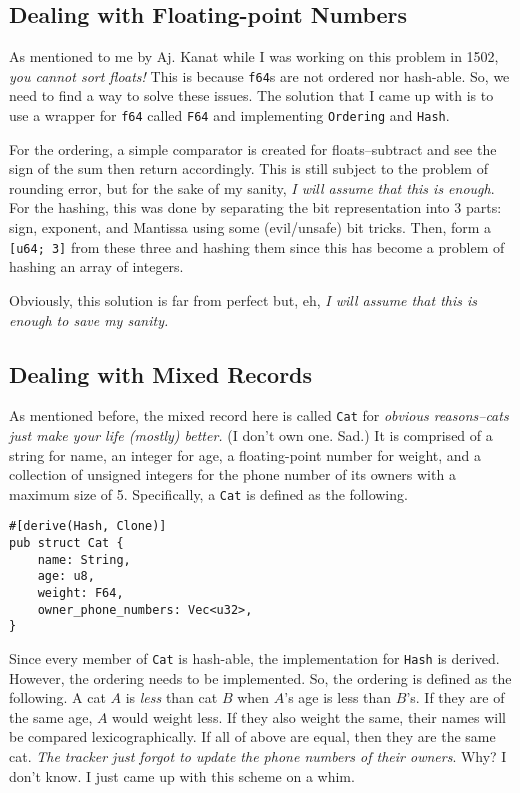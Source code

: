 \subsection*{Dealing with Floating-point Numbers}

As mentioned to me by Aj. Kanat while I was working on this problem in 1502, \textit{you cannot sort floats!}
This is because \texttt{f64}s are not ordered nor hash-able. So, we need to find a way to solve these issues.
The solution that I came up with is to use a wrapper for \texttt{f64} called \texttt{F64} and implementing \texttt{Ordering} and \texttt{Hash}.

For the ordering, a simple comparator is created for floats--subtract and see the sign of the sum then return accordingly.
This is still subject to the problem of rounding error, but for the sake of my sanity, \textit{I will assume that this is enough}.
For the hashing, this was done by separating the bit representation into 3 parts: sign, exponent, and Mantissa using some (evil/unsafe) bit tricks.
Then, form a \texttt{[u64; 3]} from these three and hashing them since this has become a problem of hashing an array of integers.

Obviously, this solution is far from perfect but, eh, \textit{I will assume that this is enough to save my sanity.}

\subsection*{Dealing with Mixed Records}

As mentioned before, the mixed record here is called \texttt{Cat} for \textit{obvious reasons--cats just make your life (mostly) better.} (I don't own one. Sad.) It is comprised of a string for name, an integer for age, a floating-point number for weight, and a collection of unsigned integers for the phone number of its owners with a maximum size of 5. Specifically, a \texttt{Cat} is defined as the following.

\begin{verbatim}
#[derive(Hash, Clone)]
pub struct Cat {
    name: String,
    age: u8,
    weight: F64,
    owner_phone_numbers: Vec<u32>,
}
\end{verbatim}

Since every member of \texttt{Cat} is hash-able, the implementation for \texttt{Hash} is derived.
However, the ordering needs to be implemented. So, the ordering is defined as the following. A cat $A$ is \textit{less} than cat $B$ when $A$'s age is less than $B$'s. If they are of the same age, $A$ would weight less. If they also weight the same, their names will be compared lexicographically. If all of above are equal, then they are the same cat. \textit{The tracker just forgot to update the phone numbers of their owners}.
Why? I don't know. I just came up with this scheme on a whim.

